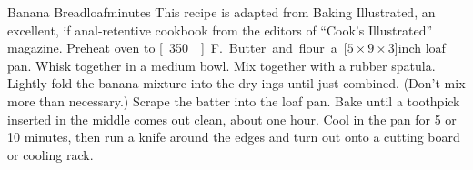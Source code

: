 \begin{recipe}{Banana Bread}{\unit[1]{loaf}}{\unit[90]{minutes}}
\freeform This recipe is adapted from Baking Illustrated, an excellent, if anal-retentive cookbook from the editors of ``Cook's Illustrated'' magazine.
\newstep Preheat oven to \unit[350\0]{F.} Butter and flour a \unit[$5\times 9\times 3$]{inch} loaf pan.
Whisk together in a medium bowl.
Mix together with a rubber spatula. Lightly fold the banana mixture
into the dry ings until just combined. (Don't mix more than
necessary.) Scrape the batter into the loaf pan. Bake until a toothpick
inserted in the middle comes out clean, about one hour. Cool in the
pan for 5 or 10 minutes, then run a knife around the edges and turn
out onto a cutting board or cooling rack.
\end{recipe}
